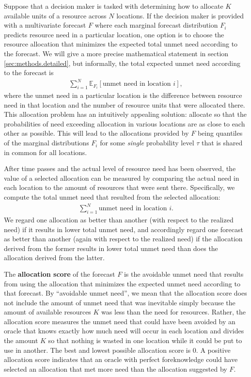 \documentclass{article}\usepackage[]{graphicx}\usepackage[]{xcolor}
\begin{document}
Suppose that a decision maker is tasked with determining how to allocate $K$ available units of a resource across $N$
locations. If the decision maker is provided with a multivariate forecast $F$ where each marginal forecast distribution
$F_i$ predicts resource need in a particular location, one option is to choose the resource allocation that minimizes
the expected total unmet need according to the forecast. We will give a more precise mathematical statement in section
\ref{sec:methods.detailed}, but informally, the total expected unmet need according to the forecast is
\begin{align}
\sum_{i=1}^N \mathbb{E}_{F_i}[\text{unmet need in location $i$}], \label{eqn:informal_objective}
\end{align}
where the unmet need in a particular location is the difference between resource need in that location and the number of
resource units that were allocated there. This allocation problem has an intuitively appealing solution: allocate so that the
probabilities of need exceeding allocation in various locations are as close to each other as possible. This will lead
to the allocations provided by $F$ being quantiles of the marginal distributions $F_i$ for some \emph{single}
probability level $\tau$ that is shared in common for all locations.

After time passes and the actual level of resource need has been observed, the value of a selected allocation can be
measured by comparing the actual need in each location to the amount of resources that were sent there. Specifically, we
compute the total unmet need that resulted from the selected allocation:
\begin{align}
    \sum_{i=1}^N \text{unmet need in location $i$}. \label{eqn:informal_loss}
\end{align}
We regard one allocation as better than another (with respect to the realized need) if it results in lower total 
unmet need, and accordingly regard one forecast as better than another (again with respect to the realized need)
if the allocation derived from the former results in lower total unmet need than does the allocation derived from the 
latter.

The \textbf{allocation score} of the forecast $F$ is the avoidable unmet need that results from using the allocation
that minimizes the expected unmet need according to that forecast. By ``avoidable unmet need'', we mean that the
allocation score does not include the amount of unmet need that was inevitable simply because the amount of available
resources $K$ was less than the need for resources. Rather, the allocation score measures the unmet need that could have
been avoided by an oracle that knows exactly how much need will occur in each location and divides the amount $K$ so
that nothing is wasted in one location while it could be put to use in another. The best and lowest possible allocation 
score is 0.  A positive allocation score indicates that an oracle with perfect foreknowledge could have selected an allocation 
that met more need than the allocation suggested by $F$.
\end{document}
